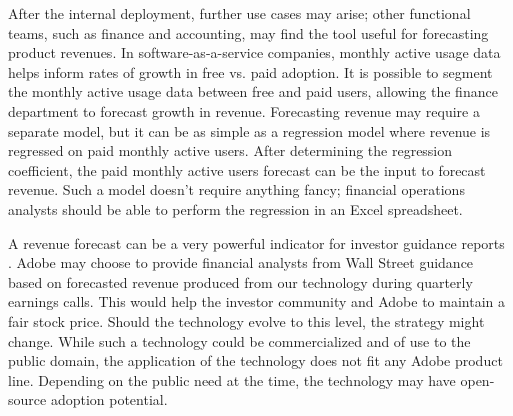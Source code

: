 \documentclass[11pt, oneside, authoryear]{report}
\begin{document}
After the internal deployment, further use cases may arise; other functional teams, such as finance and accounting, may find the tool useful for forecasting product revenues. In software-as-a-service companies, monthly active usage data helps inform rates of growth in free vs. paid adoption. It is possible to segment the monthly active usage data between free and paid users, allowing the finance department to forecast growth in revenue. Forecasting revenue may require a separate model, but it can be as simple as a regression model where revenue is regressed on paid monthly active users. After determining the regression coefficient, the paid monthly active users forecast can be the input to forecast revenue. Such a model doesn't require anything fancy; financial operations analysts should be able to perform the regression in an Excel spreadsheet.

A revenue forecast can be a very powerful indicator for investor guidance reports \citep{xu}. Adobe may choose to provide financial analysts from Wall Street guidance based on forecasted revenue produced from our technology during quarterly earnings calls. This would help the investor community and Adobe to maintain a fair stock price. Should the technology evolve to this level, the strategy might change. While such a technology could be commercialized and of use to the public domain, the application of the technology does not fit any Adobe product line. Depending on the public need at the time, the technology may have open-source adoption potential.

\newpage


\end{document}
